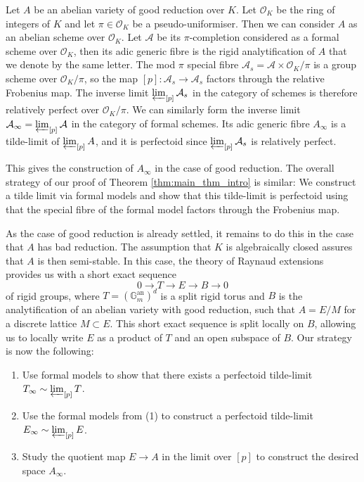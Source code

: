 \documentclass[10pt,oneside]{amsart}
\theoremstyle{definition}
\begin{document}
Let $A$ be an abelian variety of good reduction over $K$. Let $\mathcal O_K$ be the ring of integers of $K$ and let $\pi\in\mathcal O_K$ be a pseudo-uniformiser. Then we can consider $A$ as an abelian scheme over $\mathcal O_K$. Let $\mathcal A$ be its $\pi$-completion considered as a formal scheme over $\mathcal O_K$, then its adic generic fibre is the rigid analytification of $A$ that we denote by the same letter. The mod $\pi$ special fibre $\mathcal A_s = \mathcal A \times \mathcal O_K/\pi$ is a group scheme over $\mathcal O_K/\pi$, so the map $[p]:\mathcal A_s\rightarrow \mathcal A_s$ factors through the relative Frobenius map. The inverse limit $ \varprojlim_{[p]} \mathcal A_s $ in the category of schemes is therefore relatively perfect over $\mathcal O_K/\pi$. We can similarly form the inverse limit $\mathcal A_{\infty} = \varprojlim_{[p]} \mathcal A$ in the category of formal schemes. Its adic generic fibre $A_\infty$ is a tilde-limit of $\varprojlim_{[p]}A$, and it is perfectoid since $ \varprojlim_{[p]} \mathcal A_s $ is relatively perfect.

This gives the construction of $A_\infty$ in the case of good reduction. The overall strategy of our proof of Theorem \ref{thm:main_thm_intro} is similar: We construct a tilde limit via formal models and show that this tilde-limit is perfectoid using that the special fibre of the formal model factors through the Frobenius map. 

As the case of good reduction is already settled, it remains to do this in the case that $A$ has bad reduction. The assumption that $K$ is algebraically closed assures that $A$ is then semi-stable.
In this case, the theory of Raynaud extensions provides us with a short exact sequence 
\[ 0 \rightarrow T \rightarrow E  \rightarrow  B  \rightarrow  0\]
of rigid groups, where $T = (\mathbb G_m^{\text{an}})^{d}$ is a split rigid torus and $B$ is the analytification of an abelian variety with good reduction, such that $A = E/M$ for a discrete lattice $M \subset E$. This short exact sequence is split locally on $B$, allowing us to locally write $E$ as a product of $T$ and an open subspace of $B$.
Our strategy is now the following:
\begin{enumerate}
\item Use formal models to show that there exists a perfectoid tilde-limit $T_\infty\sim\varprojlim_{[p]} T$.
\item Use the formal models from (1) to construct a perfectoid tilde-limit $E_\infty\sim\varprojlim_{[p]} E$.
\item Study the quotient map $E\rightarrow A$ in the limit over $[p]$ to construct the desired space $A_\infty$.
\end{enumerate}
\end{document}

